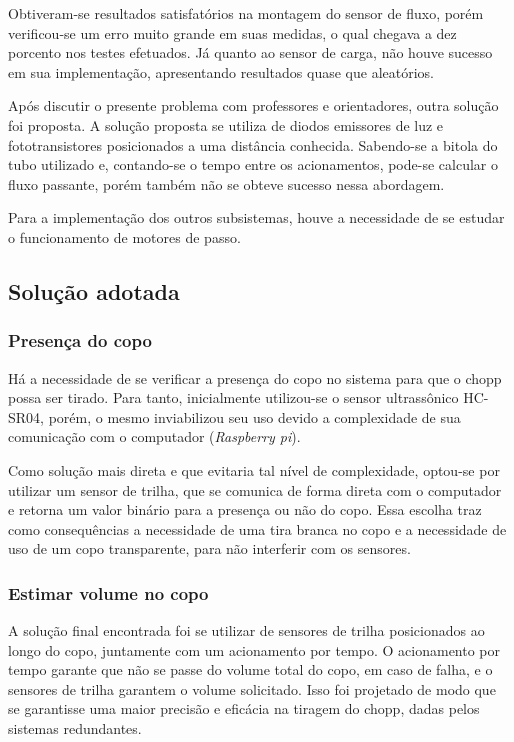 Obtiveram-se resultados satisfatórios na montagem do sensor de fluxo, porém verificou-se um erro 
muito grande em suas medidas, o qual chegava a dez porcento nos testes efetuados. 
Já quanto ao sensor de carga, não houve sucesso em sua implementação, apresentando resultados quase que aleatórios.

Após discutir o presente problema com professores e orientadores, outra solução foi proposta.
A solução proposta se utiliza de diodos emissores de luz e fototransistores posicionados a 
uma distância conhecida. Sabendo-se a bitola do tubo utilizado e, contando-se o tempo entre 
os acionamentos, pode-se calcular o fluxo passante, porém também não se obteve sucesso nessa abordagem.

Para a implementação dos outros subsistemas,  houve a necessidade de se estudar o funcionamento de motores de passo.


\subsection{Solução adotada}

\subsubsection{Presença do copo}
Há a necessidade de se verificar a presença do copo no sistema para que o chopp possa ser tirado. 
Para tanto, inicialmente utilizou-se o sensor ultrassônico HC-SR04, porém, o mesmo inviabilizou seu
uso devido a complexidade de sua comunicação com o computador (\textit{Raspberry pi}).

Como solução mais direta e que evitaria tal nível de complexidade, optou-se por utilizar um sensor de trilha, 
que se comunica de forma direta com o computador e retorna um valor binário para a presença ou não do copo. 
Essa escolha traz como consequências a necessidade de uma tira branca no copo
 e a necessidade de uso de um copo transparente, para não interferir com os sensores.


\subsubsection{Estimar volume no copo}
A solução final encontrada foi se utilizar de sensores de trilha posicionados ao longo do copo, juntamente com um acionamento 
por tempo. O acionamento por tempo garante que não se passe do volume total do copo, em caso de falha,
e o sensores de trilha garantem o volume solicitado. Isso foi projetado de modo que se garantisse uma maior precisão e eficácia
na tiragem do chopp, dadas pelos sistemas redundantes.


